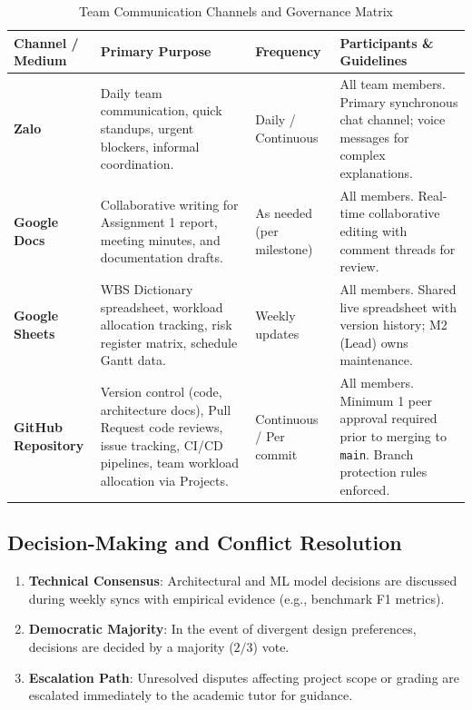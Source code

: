 \documentclass[11pt, a4paper]{article}
\newcommand{\code}[1]{\texttt{\small #1}}
\begin{document}
\begin{table}[H]
  \centering
  \small
  \caption{Team Communication Channels and Governance Matrix}
  \label{tab:communication-matrix}
  \begin{tabularx}{\textwidth}{@{}L{2.5cm} L{2.8cm} L{2.2cm} Y@{}}
    \toprule
    \textbf{Channel / Medium} & \textbf{Primary Purpose} & \textbf{Frequency} & \textbf{Participants \& Guidelines} \\
    \midrule
    \textbf{Zalo} &
    Daily team communication, quick standups, urgent blockers, informal coordination. &
    Daily / Continuous &
    All team members. Primary synchronous chat channel; voice messages for complex explanations. \\
    \textbf{Google Docs} &
    Collaborative writing for Assignment 1 report, meeting minutes, and documentation drafts. &
    As needed (per milestone) &
    All members. Real-time collaborative editing with comment threads for review. \\
    \textbf{Google Sheets} &
    WBS Dictionary spreadsheet, workload allocation tracking, risk register matrix, schedule Gantt data. &
    Weekly updates &
    All members. Shared live spreadsheet with version history; M2 (Lead) owns maintenance. \\
    \textbf{GitHub Repository} &
    Version control (code, architecture docs), Pull Request code reviews, issue tracking, CI/CD pipelines, team workload allocation via Projects. &
    Continuous / Per commit &
    All members. Minimum 1 peer approval required prior to merging to \code{main}. Branch protection rules enforced. \\
    \bottomrule
  \end{tabularx}
\end{table}

\subsection{Decision-Making and Conflict Resolution}
\begin{enumerate}
  \item \textbf{Technical Consensus}: Architectural and ML model decisions are discussed during weekly syncs with empirical evidence (e.g., benchmark F1 metrics).
  \item \textbf{Democratic Majority}: In the event of divergent design preferences, decisions are decided by a majority ($2/3$) vote.
  \item \textbf{Escalation Path}: Unresolved disputes affecting project scope or grading are escalated immediately to the academic tutor for guidance.
\end{enumerate}
\end{document}
